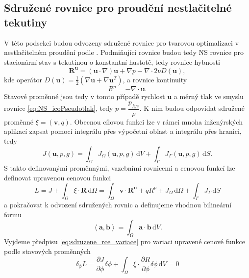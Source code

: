\subsection{Sdružené rovnice pro proudění nestlačitelné tekutiny}

V této podsekci budou odvozeny sdružené rovnice pro tvarovou optimalizaci v nestlačitelném proudění podle \cite{papadimitriou2007continuous, furst2020mko2}. Podmiňující rovnice budou tedy NS rovnice pro stacionární stav s tekutinou o konstantní hustotě, tedy rovnice hybnosti
\begin{equation}\label{eq:rce_hybnosti}
\mathbf{R^u}=\left(\mathbf{u}\cdot\nabla\right)\mathbf{u} + \nabla p - \nabla \cdot 2 \nu D(\mathbf{u}),
\end{equation}
kde operátor $ D(\mathbf{u})=\frac{1}{2}(\nabla\mathbf{u}+\nabla\mathbf{u}^T) $, a rovnice kontinuity
\begin{equation}
R^p=-\nabla \cdot \mathbf{u}.
\end{equation}\label{eq:rce_kontinuity}
Stavové proměnné jsou tedy v tomto případě rychlost $ \mathbf{u} $ a měrný tlak ve smyslu rovnice \ref{eq:NS_icoPseudotlak}, tedy $ p = \dfrac{p_{fyz}}{\rho}$. K nim budou odpovídat sdružené proměnné $ \xi = (\mathbf{v},q) $. Obecnou cílovou funkci lze v rámci mnoha inženýrských aplikací zapsat pomocí integrálu přes výpočetní oblast a integrálu přes hranici, tedy
\begin{equation}\label{eq:cenova_fce}
J(\mathbf{u},p,g)=\int_{\Omega} J_\Omega(\mathbf{u},p,g) \, \mathrm{d}V + \int_{\Gamma}J_\Gamma(\mathbf{u},p,g) \, \mathrm{d}S.
\end{equation}
S takto definovanými proměnnými, vazebními rovnicemi a cenovou funkcí lze definovat upravenou cenovou funkci
\begin{equation}
L= J + \int_\Omega \xi \cdot \mathbf{R} \,\mathrm{d}\Omega 
= \int_\Omega \mathbf{v}\cdot\mathbf{R^u}+ q R^p +J_\Omega  \,\mathrm{d}\Omega + \int_{\Gamma}J_\Gamma \, \mathrm{d}S
\end{equation}
a pokračovat k odvození sdružených rovnic a definujeme vhodnou bilineární formu 
\begin{equation}
\left\langle \mathbf{a},\mathbf{b} \right\rangle = \int_{\Omega} \mathbf{a} \cdot \mathbf{b} \, \mathrm{d}V.
\end{equation} 
Vyjdeme předpisu \ref{eq:sdruzene_rce_variace} pro variaci upravené cenové funkce podle stavových proměnných
\begin{equation} \label{eq:sdruzena_variace}
\delta_\phi L = 
\frac{\partial J}{\partial \phi}\delta\phi
+
\int_{\Omega} 
\xi \cdot \dfrac{\partial R}{\partial \phi}  \delta\phi 
\, \mathrm{d}V
 = 0
\end{equation}
